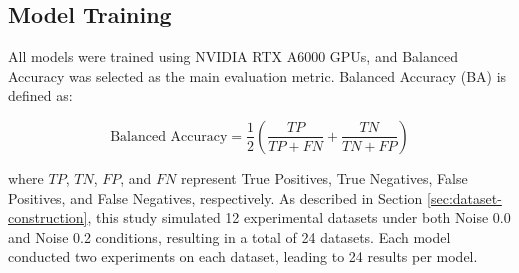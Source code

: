 \documentclass{article}
\begin{document}
\subsection{Model Training}
All models were trained using NVIDIA RTX A6000 GPUs, and Balanced Accuracy was selected as the main evaluation metric. Balanced Accuracy (BA) is defined as:

\begin{equation}
\text{Balanced Accuracy} = \frac{1}{2} \left( \frac{TP}{TP + FN} + \frac{TN}{TN + FP} \right)  
\end{equation}

where $TP$, $TN$, $FP$, and $FN$ represent True Positives, True Negatives, False Positives, and False Negatives, respectively. As described in Section \ref{sec:dataset-construction}, this study simulated 12 experimental datasets under both Noise 0.0 and Noise 0.2 conditions, resulting in a total of 24 datasets. Each model conducted two experiments on each dataset, leading to 24 results per model.



\end{document}
